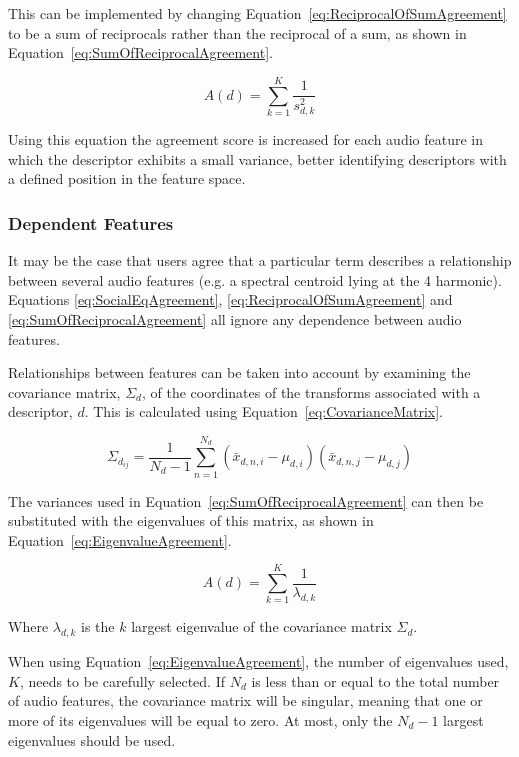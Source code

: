 			This can be implemented by changing Equation~\ref{eq:ReciprocalOfSumAgreement} to be a sum of
			reciprocals rather than the reciprocal of a sum, as shown in
			Equation~\ref{eq:SumOfReciprocalAgreement}.

			\begin{equation}
				A(d) = \sum_{k = 1}^{K} \frac{1}{s_{d,k}^{2}}
				\label{eq:SumOfReciprocalAgreement}
			\end{equation}

			Using this equation the agreement score is increased for each audio feature in which the
			descriptor exhibits a small variance, better identifying descriptors with a defined position in
			the feature space.

		\subsubsection*{Dependent Features}
			It may be the case that users agree that a particular term describes a relationship between several
			audio features (e.g. a spectral centroid lying at the 4 harmonic). Equations
			\ref{eq:SocialEqAgreement}, \ref{eq:ReciprocalOfSumAgreement} and \ref{eq:SumOfReciprocalAgreement}
			all ignore any dependence between audio features.

			Relationships between features can be taken into account by examining the covariance matrix,
			$\Sigma_{d}$, of the coordinates of the transforms associated with a descriptor, $d$. This is
			calculated using Equation~\ref{eq:CovarianceMatrix}.

			\begin{equation}
				{\Sigma_{d_{ij}}} = \frac{1}{N_{d} - 1} \sum_{n = 1}^{N_{d}} 
						     (\bar{x}_{d,n,i} - \mu_{d,i})(\bar{x}_{d,n,j} - \mu_{d,j})
				\label{eq:CovarianceMatrix}
			\end{equation}
			
			The variances used in Equation~\ref{eq:SumOfReciprocalAgreement} can then be substituted with the
			eigenvalues of this matrix, as shown in Equation~\ref{eq:EigenvalueAgreement}.

			\begin{equation}
				A(d) = \sum_{k = 1}^{K} \frac{1}{\lambda_{d,k}}
				\label{eq:EigenvalueAgreement}
			\end{equation}
			
			Where $\lambda_{d, k}$ is the $k$ largest eigenvalue of the covariance matrix
			$\Sigma_{d}$.

			When using Equation~\ref{eq:EigenvalueAgreement}, the number of eigenvalues used, $K$, needs to be
			carefully selected. If $N_{d}$ is less than or equal to the total number of audio features, the
			covariance matrix will be singular, meaning that one or more of its eigenvalues will be equal to
			zero. At most, only the $N_{d} - 1$ largest eigenvalues should be used.
			
